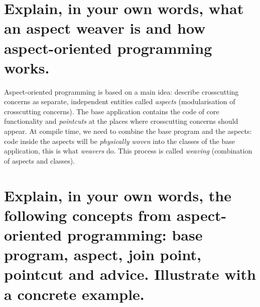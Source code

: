 \section{Explain, in your own words, what an aspect weaver is and how aspect-oriented
programming works.}

\begin{solution}

Aspect-oriented programming is based on a main idea: describe crosscutting concerns as separate, independent entities called \textit{aspects} (modularisation of crosscutting concerns). The base application contains the code of core functionality and \textit{pointcuts} at the places where crosscutting concerns should appear. At compile time, we need to combine the base program and the aspects: code inside the aspects will be \textit{physically woven} into the classes of the base application, this is what \textit{weavers} do. This process is called \textit{weaving} (combination of aspects and classes).

\end{solution}

\section{Explain, in your own words, the following concepts from aspect-oriented programming:
base program, aspect, join point, pointcut and advice. Illustrate with a concrete example.}

